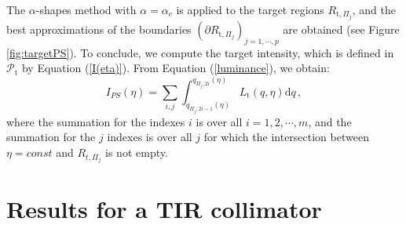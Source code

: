  \noindent The $\alpha$-shapes method with $\alpha = \alpha_{c}$ is applied to the target regions $R_{\textrm{t}, \Pi_j}$, and the
 best approximations of the boundaries
 $(\partial R_{\textrm{t}, \Pi_j})_{j = 1, \cdots, p}$ are obtained (see Figure \ref{fig:targetPS}).
\newline \indent To conclude, we compute the target intensity, which is defined in $\mathcal{P}_{\textrm{t}}$ by Equation (\ref{I(eta)}).
From Equation (\ref{luminance}), we obtain:
\begin{equation}
I_{PS}(\eta) = \sum_{ i, j }\int_{q_{\Pi_j,2i-1}( \eta)}^{q_{\Pi_j, 2i}( \eta)}L_\textrm{t}(q, \eta)\textrm{d}q\,,
\label{eq:Ips}
\end{equation}
where the summation for the indexes $i$ is over all $i = 1,2, \cdots, m$, and the summation for the $j$ indexes is over all $j$ for which the intersection between $\eta = const$ and $R_{t, \Pi_j}$ is not empty.









\section{Results for a TIR collimator}
% 
\label{sec:Tir_alpha}

